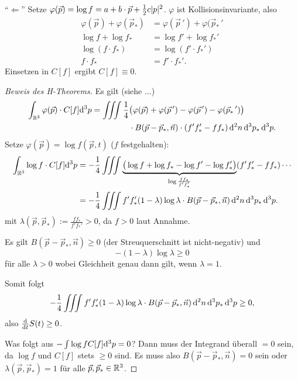 ``$\Leftarrow$'' Setze $\varphi(\vec{p}) = \log f = a + b \cdot \vec{p} +
\frac{1}{2} c |p|^2$. $\varphi$ ist Kollisionsinvariante, also
\[ \begin{aligned}
    \varphi(\vec{p}) + \varphi(\vec{p}_*) &= \varphi(\vec{p}\,') +
    \varphi(\vec{p}_*\,' \\
    \log f + \log f_* &= \log f' + \log f_*' \\
    \log( f \cdot f_* ) &= \log( f' \cdot f_*' ) \\
    f \cdot f_* &= f' \cdot f_*'.
  \end{aligned}
\]
Einsetzen in $C[f]$ ergibt $C[f] \equiv 0$.

\begin{proof}[Beweis des H-Theorems]
Es gilt (siehe ...)
\[ \begin{aligned}
    \int_{\mathbb{R}^3} \varphi(\vec{p}) \cdot C[f] \mathrm{d}^3 p =
    \iiint \frac{1}{4}
    &\big( \varphi(\vec{p}) + \varphi(\vec{p}\,') - \varphi(\vec{p}\,') 
    - \varphi( \vec{p}_*\,') \big) \\
    &\cdot B( \vec{p} - \vec{p}_*, \vec{n} )
    \cdot (f'f_*' - ff_*) \,
    \mathrm{d}^2 n \, \mathrm{d}^3 p_* \, \mathrm{d}^3 p.
  \end{aligned}
\]
Setze $\varphi(\vec{p}) = \log f(\vec{p}, t)$ ($f$ festgehalten):
\[ \begin{aligned}
    \int_{\mathbb{R}^3} \log f \cdot C[f] \mathrm{d}^3 p &=
    - \frac{1}{4} \iiint
    \underbrace{\big( \log f + \log f_*
      - \log f' - \log f_*' \big)}_{\log \frac{f f_*}{f' f_*'}}
    (f' f_*' - f f_* ) \cdots \\
    &= -\frac{1}{4} \iiint f' f_*' (1 - \lambda) \log \lambda \cdot B( \vec{p} -
    \vec{p}_*, \vec{n} ) \,
    \mathrm{d}^2 n \, \mathrm{d}^3 p_* \, \mathrm{d}^3 p.
  \end{aligned}
\]
mit $\lambda( \vec{p}, \vec{p}_*) := \frac{f f_*}{f' f_*'} > 0$, da $f > 0$ laut
Annahme.

Es gilt $B( \vec{p} - \vec{p}_*, \vec{n} ) \ge 0$ (der Streuquerschnitt ist
nicht-negativ) und
\[ - (1-\lambda) \log \lambda \ge 0 \]
für alle $\lambda > 0$ wobei Gleichheit genau dann gilt, wenn $\lambda = 1$.

Somit folgt
\[ -\frac{1}{4} \iiint f' f_*' (1 - \lambda) \log \lambda \cdot B( \vec{p} -
  \vec{p}_*, \vec{n} ) \,
  \mathrm{d}^2 n \, \mathrm{d}^3 p_* \, \mathrm{d}^3 p \ge 0, \]
also $\frac{\mathrm{d} }{\mathrm{d} t} S(t) \ge 0$.

Was folgt aus $- \int \log f C[f] \mathrm{d}^3 p = 0$? Dann muss der Integrand
überall $=0$ sein, da $\log f$ und $C[f]$ stets $\ge 0$ sind. Es muss also $B(
\vec{p} -  \vec{p}_*, \vec{n} ) = 0$ sein oder $\lambda( \vec{p}, \vec{p}_*) =
1$ für alle $\vec{p}, \vec{p}_* \in \mathbb{R}^3$.


\end{proof}
